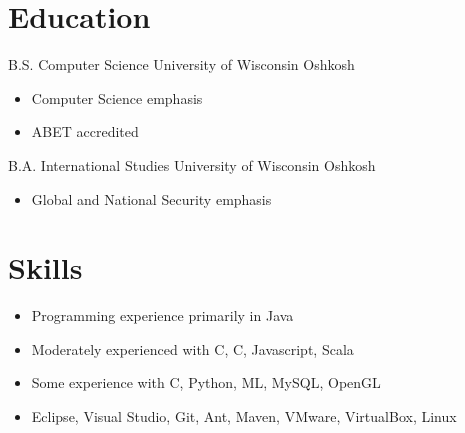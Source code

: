 \documentclass[12pt,letterpaper,sans]{moderncv}
\newcommand{\cpp}
    {C\nolinebreak\hspace{-0.05em}\raisebox{0.4ex}{\textbf{\scriptsize+}}\nolinebreak\hspace{-0.10em}\raisebox{0.4ex}{\textbf{\scriptsize+}}}
\newcommand{\csharp}
    {C\nolinebreak\hspace{-.05em}\raisebox{0.4ex}{\small\#}}
\begin{document}
\makecvtitle
\section{Education} 
    {B.S. Computer Science} 
    {University of Wisconsin Oshkosh} 
    {}{}
    {\begin{itemize}
        \item Computer Science emphasis
        \item ABET accredited
        \end{itemize}}
 {B.A. International Studies} {University of Wisconsin Oshkosh}
    {} {} 
    {\begin{itemize}
        \item Global and National Security emphasis
        \end{itemize}}
\section{Skills}
    {\begin{itemize}
        \item Programming experience primarily in Java
        \item Moderately experienced with C, \csharp, Javascript, Scala
        \item Some experience with \cpp, Python, ML, MySQL, OpenGL
        \vspace*{-\baselineskip}
        \end{itemize}}
    {\begin{itemize}
        \item Eclipse, Visual Studio, Git, Ant, Maven, VMware, VirtualBox, Linux
        \vspace*{-\baselineskip}
        \end{itemize}}
\end{document}
